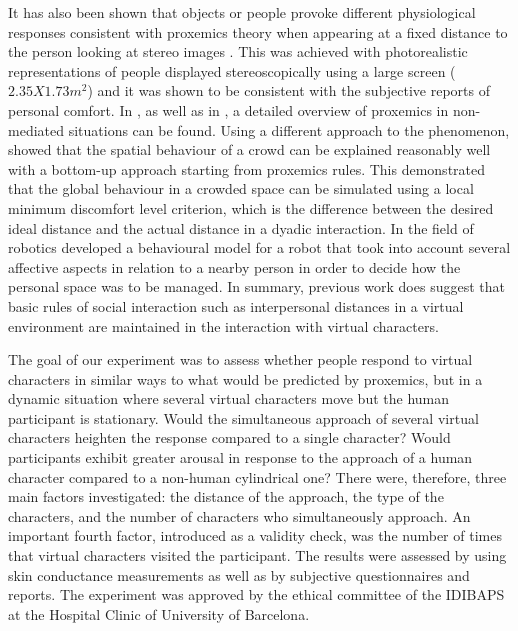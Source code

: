 \documentclass[
		twoside,openright,titlepage,numbers=noenddot,manychapters,
		headinclude,%
                footinclude=false,cleardoublepage=empty,
                BCOR=5mm,
		fontsize=11pt, %
                 enabledeprecatedfontcommands]{scrreprt}
\begin{document}
It has also been shown that objects or people provoke different physiological responses consistent with proxemics theory when appearing at a fixed distance to the person looking at stereo images \cite[]{wilcox2006personal}. This was achieved with photorealistic representations of people displayed stereoscopically using a large screen ($2.35  X 1.73 m^2 $) and it was shown to be consistent with the subjective reports of personal comfort. In \cite[]{wilcox2006personal}, as well as in \cite{bailenson2001etr}, a detailed overview of proxemics in non-mediated situations can be found. Using a different approach to the phenomenon, \cite{beltran2006sbg} showed that the spatial behaviour of a crowd can be explained reasonably well with a bottom-up approach starting from proxemics rules. This demonstrated that the global behaviour in a crowded space can be simulated using a local minimum discomfort level criterion, which is the difference between the desired ideal distance and the actual distance in a dyadic interaction. In the field of robotics \cite{brooks2007bon} developed a behavioural model for a robot that took into account several affective aspects in relation to a nearby person in order to decide how the personal space was to be managed. In summary, previous work does suggest that basic rules of social interaction such as interpersonal distances in a virtual environment are maintained in the interaction with virtual characters.



The goal of our experiment was to assess whether people respond to virtual characters in similar ways to what would be predicted by proxemics, but in a dynamic situation where several virtual characters move but the human participant is stationary. Would the simultaneous approach of several virtual characters heighten the response compared to a single character? Would participants exhibit greater arousal in response to the approach of a human character compared to a non-human cylindrical one? There were, therefore, three main factors investigated: the distance of the approach, the type of the characters, and the number of characters who simultaneously approach. An important fourth factor, introduced as a validity check, was the number of times that virtual characters visited the participant. The results were assessed by using skin conductance measurements as well as by subjective questionnaires and reports. The experiment was approved by the ethical committee of the IDIBAPS at the Hospital Clinic of University of Barcelona.
\end{document}
